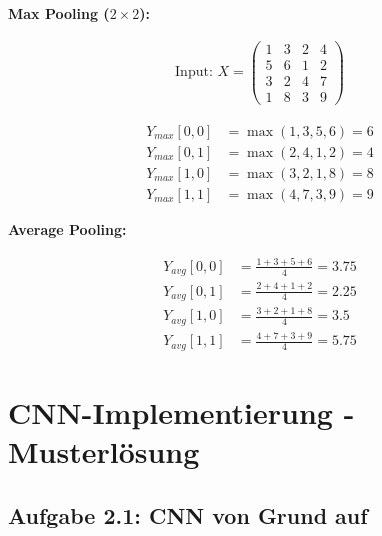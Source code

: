 ﻿\documentclass[12pt,a4paper]{article}
\begin{document}
\textbf{Max Pooling ($2 \times 2$):}

\begin{align}
\text{Input: } X = \begin{pmatrix} 
1 & 3 & 2 & 4 \\
5 & 6 & 1 & 2 \\
3 & 2 & 4 & 7 \\
1 & 8 & 3 & 9
\end{pmatrix}
\end{align}

\begin{align}
Y_{max}[0,0] &= \max(1, 3, 5, 6) = 6 \\
Y_{max}[0,1] &= \max(2, 4, 1, 2) = 4 \\
Y_{max}[1,0] &= \max(3, 2, 1, 8) = 8 \\
Y_{max}[1,1] &= \max(4, 7, 3, 9) = 9
\end{align}


\textbf{Average Pooling:}

\begin{align}
Y_{avg}[0,0] &= \frac{1 + 3 + 5 + 6}{4} = 3.75 \\
Y_{avg}[0,1] &= \frac{2 + 4 + 1 + 2}{4} = 2.25 \\
Y_{avg}[1,0] &= \frac{3 + 2 + 1 + 8}{4} = 3.5 \\
Y_{avg}[1,1] &= \frac{4 + 7 + 3 + 9}{4} = 5.75
\end{align}


\section{CNN-Implementierung - Musterlösung}

\subsection{Aufgabe 2.1: CNN von Grund auf}
\end{document}
